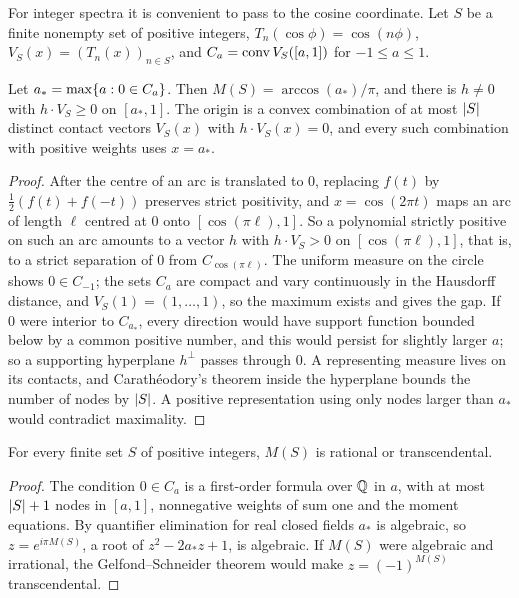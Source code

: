 For integer spectra it is convenient to pass to the cosine coordinate. Let $S$ be a finite nonempty set of
positive integers, $T_n(\cos\phi)=\cos(n\phi)$, $V_S(x)=(T_n(x))_{n\in S}$, and $C_a=\operatorname{conv} V_S([a,1])$ for
$-1\le a\le1$.

\begin{lemma}\label{zfg:lem:contact}
Let $a_*=\max\{a:0\in C_a\}$. Then $M(S)=\arccos(a_*)/\pi$, and there is $h\ne0$ with $h\cdot V_S\ge0$ on
$[a_*,1]$. The origin is a convex combination of at most $\lvert S\rvert$ distinct contact vectors $V_S(x)$ with
$h\cdot V_S(x)=0$, and every such combination with positive weights uses $x=a_*$.
\end{lemma}

\begin{proof}
After the centre of an arc is translated to $0$, replacing $f(t)$ by $\tfrac12(f(t)+f(-t))$ preserves strict
positivity, and $x=\cos(2\pi t)$ maps an arc of length $\ell$ centred at $0$ onto $[\cos(\pi\ell),1]$. So a polynomial
strictly positive on such an arc amounts to a vector $h$ with $h\cdot V_S>0$ on $[\cos(\pi\ell),1]$, that is, to a
strict separation of $0$ from $C_{\cos(\pi\ell)}$. The uniform measure on the circle shows $0\in C_{-1}$; the sets
$C_a$ are compact and vary continuously in the Hausdorff distance, and $V_S(1)=(1,\dots,1)$, so the maximum exists
and gives the gap. If $0$ were interior to $C_{a_*}$, every direction would have support function bounded below by
a common positive number, and this would persist for slightly larger $a$; so a supporting hyperplane
$h^\perp$ passes through $0$. A representing measure lives on its contacts, and Carath\'eodory's theorem inside
the hyperplane bounds the number of nodes by $\lvert S\rvert$. A positive representation using only nodes larger than
$a_*$ would contradict maximality.
\end{proof}

\begin{corollary}\label{zfg:cor:dichotomy}
For every finite set $S$ of positive integers, $M(S)$ is rational or transcendental.
\end{corollary}

\begin{proof}
The condition $0\in C_a$ is a first-order formula over $\mathbb{Q}$ in $a$, with at most $\lvert S\rvert+1$ nodes in $[a,1]$,
nonnegative weights of sum one and the moment equations. By quantifier elimination for real closed fields
$a_*$ is algebraic, so $z=e^{i\pi M(S)}$, a root of $z^2-2a_*z+1$, is algebraic. If $M(S)$ were algebraic and
irrational, the Gelfond--Schneider theorem would make $z=(-1)^{M(S)}$ transcendental.
\end{proof}

